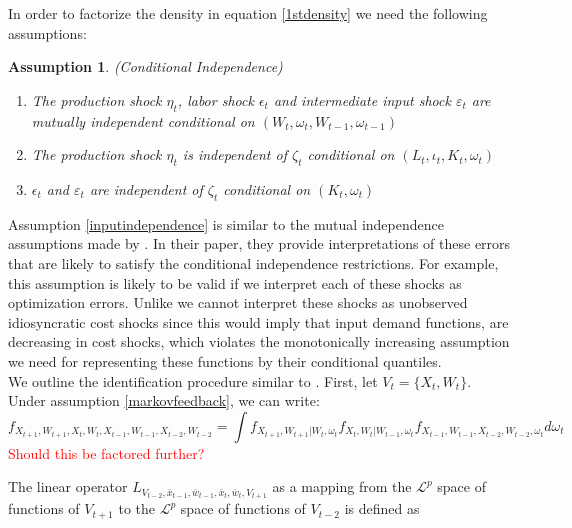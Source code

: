 \documentclass{article}
\newtheorem{assump}{Assumption}[section]
\begin{document}
In order to factorize the density in equation \eqref{1stdensity} we need the following assumptions:
\begin{assump}(Conditional Independence)\label{inputindependence}
~
    \begin{enumerate}[label=\alph*)]
        \item The production shock $\eta_{t}$, labor shock $\epsilon_{t}$ and intermediate input shock $\varepsilon_{t}$ are mutually independent conditional on $(W_{t}, \omega_{t}, W_{t-1}, \omega_{t-1})$
        \item The production shock $\eta_{t}$ is independent of $\zeta_{t}$ conditional on $(L_{t}, \iota_{t}, K_{t}, \omega_{t})$
        \item $\epsilon_{t}$ and $\varepsilon_{t}$ are independent of $\zeta_{t}$ conditional on $(K_{t}, \omega_{t})$
    \end{enumerate}
\end{assump}
Assumption \eqref{inputindependence} is similar to the mutual independence assumptions made by \cite{Hu2019}. In their paper, they provide interpretations of these errors that are likely to satisfy the conditional independence restrictions. For example, this assumption is likely to be valid if we interpret each of these shocks as optimization errors. Unlike \cite{Hu2019} we cannot interpret these shocks as unobserved idiosyncratic cost shocks since this would imply that input demand functions, are decreasing in cost shocks, which violates the monotonically increasing assumption we need for representing these functions by their conditional quantiles.\\

We outline the identification procedure similar to \cite{Hu2012}. First, let $V_{t}=\{X_{t}, W_{t}\}$. Under assumption \eqref{markovfeedback}, we can write:
 \begin{equation}\label{obsdens}
 f_{X_{t+1}, W_{t+1}, X_{t}, W_{t}, X_{t-1}, W_{t-1}, X_{t-2}, W_{t-2}}=\int f_{X_{t+1},W_{t+1}|W_{t},\omega_{t}}f_{X_{t}, W_{t}|W_{t-1},\omega_{t}}f_{X_{t-1}, W_{t-1}, X_{t-2}, W_{t-2}, \omega_{t}}d\omega_{t}
 \end{equation}
 \textcolor{red}{Should this be factored further?}

The linear operator $L_{V_{t-2},\bar{x}_{t-1},\bar{w}_{t-1},\bar{x}_{t},\bar{w}_{t}, V_{t+1}}$ as a mapping from the $\mathcal{L}^{p}$ space of functions of $V_{t+1}$ to the $\mathcal{L}^{p}$ space of functions of $V_{t-2}$ is defined as
\end{document}
